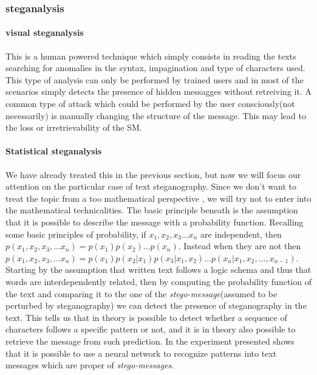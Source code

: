 \documentclass[../../main.tex]{subfiles}
\begin{document}
    \subsubsection{steganalysis}

    \paragraph{visual steganalysis}
    This is a human powered technique which simply consists in reading the texts searching for anomalies in the syntax, 
    impagination and type of characters used. This type of analysis can only be performed by trained users and in most of the scenarios simply detects the presence of hidden messagges without retreiving it.
    A common type of attack which could be performed by the user consciously(not necessarily) is manually changing the structure of the message. This may lead to the loss or irretrievability of the SM.

    \paragraph{Statistical steganalysis}
    We have already treated this in the previous section, but now we will focus our attention on the particular case of text steganography.
    Since we don't want to treat the topic from a too mathematical perspective , we will try not to enter into the mathematical technicalities. The basic principle beneath is the assumption
    that it is possible to describe the message with a probability function.
    Recalling some basic principles of probability, if $ x_1, x_2, x_3 \dots x_n $ are independent, then $ p(x_1, x_2, x_3, ... x_n) = p(x_1) p(x_2) \dots p(x_n)$. 
    Instead when they are not then $ p(x_1, x_2, x_3, ... x_n) = p(x_1) p(x_2 | x_1) p(x_3 | x_1, x_2) \dots p(x_n | x_1, x_2, \dots, x_{n-1})$. Starting by the assumption that written text follows a logic schema and thus that words are interdependently related, then by computing the probability function
    of the text and comparing it to the one of the \emph{stego-message}(assumed to be perturbed by steganography) we can detect the presence of steganography in the text. 
    This tells us that in theory is possible to detect whether a sequence of characters follows a specific pattern or not,
    and it is in theory also possible to retrieve the message from such prediction. In \cite{fast-steg-method} the experiment presented shows that it is possible 
    to use a neural network to recognize patterns into text messages which are proper of \emph{stego-messages}.
\end{document}

